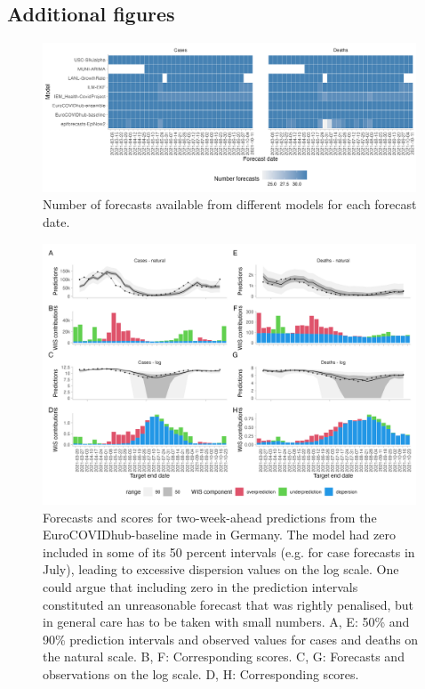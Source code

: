 \documentclass{article}
\begin{document}
\subsection{Additional figures}

\begin{figure}[h!]
    \centering
    \includegraphics[width=0.99\textwidth]{output/figures/number-avail-forecasts.png}
    \caption{
    Number of forecasts available from different models for each forecast date. 
    }
    \label{fig:HUB-num-avail-models}
\end{figure}


\begin{figure}[h!]
    \centering
    \includegraphics[width=0.99\textwidth]{output/figures/HUB-model-comparison-baseline.png}
    \caption{
    Forecasts and scores for two-week-ahead predictions from the EuroCOVIDhub-baseline made in Germany. The model had zero included in some of its 50 percent intervals (e.g. for case forecasts in July), leading to excessive dispersion values on the log scale. One could argue that including zero in the prediction intervals constituted an unreasonable forecast that was rightly penalised, but in general care has to be taken with small numbers. A, E: 50\% and 90\% prediction intervals and observed values for cases and deaths on the natural scale. B, F: Corresponding scores. C, G: Forecasts and observations on the log scale. D, H: Corresponding scores. 
    }
    \label{fig:HUB-model-comparison-baseline}
\end{figure}
\end{document}
